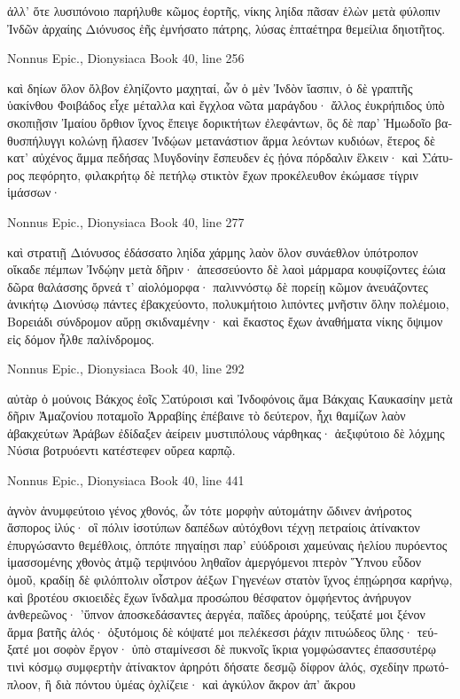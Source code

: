 \documentclass[12pt,letterpaper,twoside,final]{memoir}
\begin{document}
\begin{greek}
ἀλλ' ὅτε λυσιπόνοιο παρήλυθε κῶμος ἑορτῆς, 
νίκης ληίδα πᾶσαν ἑλὼν μετὰ φύλοπιν Ἰνδῶν 
ἀρχαίης Διόνυσος ἑῆς ἐμνήσατο πάτρης, 
λύσας ἑπταέτηρα θεμείλια δηιοτῆτος. 



Nonnus Epic., Dionysiaca 
Book 40, line 256

καὶ δηίων ὅλον ὄλβον ἐληίζοντο μαχηταί, 
ὧν ὁ μὲν Ἰνδὸν ἴασπιν, ὁ δὲ γραπτῆς ὑακίνθου 
Φοιβάδος εἶχε μέταλλα καὶ ἔγχλοα νῶτα μαράγδου· 
ἄλλος ἐυκρήπιδος ὑπὸ σκοπιῇσιν Ἰμαίου 
ὄρθιον ἴχνος ἔπειγε δορικτήτων ἐλεφάντων, 
ὃς δὲ παρ' Ἡμωδοῖο βαθυσπήλυγγι κολώνῃ 
ἤλασεν Ἰνδῴων μετανάστιον ἅρμα λεόντων 
κυδιόων, ἕτερος δὲ κατ' αὐχένος ἅμμα πεδήσας 
Μυγδονίην ἔσπευδεν ἐς ᾐόνα πόρδαλιν ἕλκειν· 
καὶ Σάτυρος πεφόρητο, φιλακρήτῳ δὲ πετήλῳ 
στικτὸν ἔχων προκέλευθον ἐκώμασε τίγριν ἱμάσσων· 




Nonnus Epic., Dionysiaca 
Book 40, line 277

καὶ στρατιῇ Διόνυσος ἐδάσσατο ληίδα χάρμης 
λαὸν ὅλον συνάεθλον ὑπότροπον οἴκαδε πέμπων 
Ἰνδῴην μετὰ δῆριν· ἀπεσσεύοντο δὲ λαοὶ 
μάρμαρα κουφίζοντες ἑώια δῶρα θαλάσσης 
ὄρνεά τ' αἰολόμορφα· παλιννόστῳ δὲ πορείῃ 
κῶμον ἀνευάζοντες ἀνικήτῳ Διονύσῳ 
πάντες ἐβακχεύοντο, πολυκμήτοιο λιπόντες 
μνῆστιν ὅλην πολέμοιο, Βορειάδι σύνδρομον αὔρῃ 
σκιδναμένην· καὶ ἕκαστος ἔχων ἀναθήματα νίκης 
ὄψιμον εἰς δόμον ἦλθε παλίνδρομος. 



Nonnus Epic., Dionysiaca 
Book 40, line 292

                                           αὐτὰρ ὁ μούνοις 
Βάκχος ἑοῖς Σατύροισι καὶ Ἰνδοφόνοις ἅμα Βάκχαις 
Καυκασίην μετὰ δῆριν Ἀμαζονίου ποταμοῖο 
Ἀρραβίης ἐπέβαινε τὸ δεύτερον, ἧχι θαμίζων 
λαὸν ἀβακχεύτων Ἀράβων ἐδίδαξεν ἀείρειν 
μυστιπόλους νάρθηκας· ἀεξιφύτοιο δὲ λόχμης 
Νύσια βοτρυόεντι κατέστεφεν οὔρεα καρπῷ. 



Nonnus Epic., Dionysiaca 
Book 40, line 441

ἁγνὸν ἀνυμφεύτοιο γένος χθονός, ὧν τότε μορφὴν 
αὐτομάτην ὤδινεν ἀνήροτος ἄσπορος ἰλύς· 
οἳ πόλιν ἰσοτύπων δαπέδων αὐτόχθονι τέχνῃ 
πετραίοις ἀτίνακτον ἐπυργώσαντο θεμέθλοις, 
ὁππότε πηγαίῃσι παρ' εὐύδροισι χαμεύναις 
ἠελίου πυρόεντος ἱμασσομένης χθονὸς ἀτμῷ 
τερψινόου ληθαῖον ἀμεργόμενοι πτερὸν Ὕπνου 
εὗδον ὁμοῦ, κραδίῃ δὲ φιλόπτολιν οἶστρον ἀέξων 
Γηγενέων στατὸν ἴχνος ἐπῃώρησα καρήνῳ, 
καὶ βροτέου σκιοειδὲς ἔχων ἴνδαλμα προσώπου 
θέσφατον ὀμφήεντος ἀνήρυγον ἀνθερεῶνος· 
’ὕπνον ἀποσκεδάσαντες ἀεργέα, παῖδες ἀρούρης,   
τεύξατέ μοι ξένον ἅρμα βατῆς ἁλός· ὀξυτόμοις δὲ 
κόψατέ μοι πελέκεσσι ῥάχιν πιτυώδεος ὕλης· 
τεύξατέ μοι σοφὸν ἔργον· ὑπὸ σταμίνεσσι δὲ πυκνοῖς 
ἴκρια γομφώσαντες ἐπασσυτέρῳ τινὶ κόσμῳ 
συμφερτὴν ἀτίνακτον ἀρηρότι δήσατε δεσμῷ 
δίφρον ἁλός, σχεδίην πρωτόπλοον, ἣ διὰ πόντου 
ὑμέας ὀχλίζειε· καὶ ἀγκύλον ἄκρον ἀπ' ἄκρου 





\end{greek}
\end{document}
